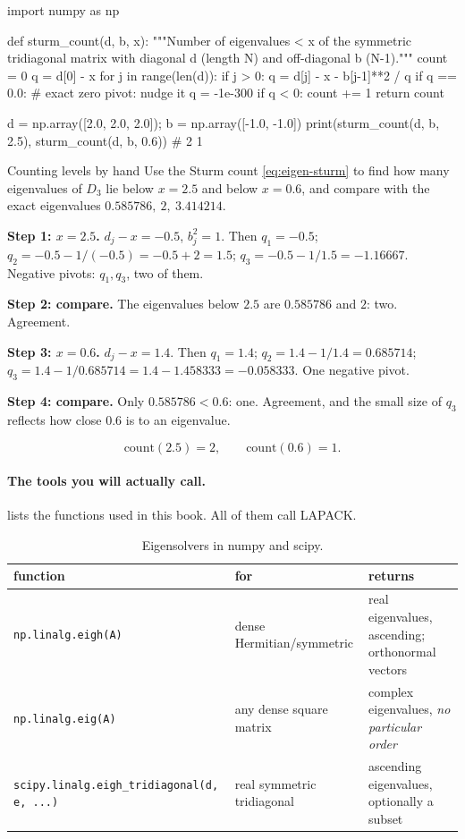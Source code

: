 \begin{pycode}
import numpy as np

def sturm_count(d, b, x):
    """Number of eigenvalues < x of the symmetric tridiagonal
    matrix with diagonal d (length N) and off-diagonal b (N-1)."""
    count = 0
    q = d[0] - x
    for j in range(len(d)):
        if j > 0:
            q = d[j] - x - b[j-1]**2 / q
        if q == 0.0:          # exact zero pivot: nudge it
            q = -1e-300
        if q < 0:
            count += 1
    return count

d = np.array([2.0, 2.0, 2.0]); b = np.array([-1.0, -1.0])
print(sturm_count(d, b, 2.5), sturm_count(d, b, 0.6))   # 2 1
\end{pycode}

\begin{sample}{Counting levels by hand}
Use the Sturm count \eqref{eq:eigen-sturm} to find how many eigenvalues of $D_3$ lie below $x=2.5$ and below $x=0.6$, and compare with the exact eigenvalues $0.585786,\ 2,\ 3.414214$.

\textbf{Step 1: $x=2.5$.} $d_j-x=-0.5$, $b_j^2=1$. Then $q_1=-0.5$; $q_2=-0.5-1/(-0.5)=-0.5+2=1.5$; $q_3=-0.5-1/1.5=-1.16667$. Negative pivots: $q_1,q_3$, two of them.

\textbf{Step 2: compare.} The eigenvalues below $2.5$ are $0.585786$ and $2$: two. Agreement.

\textbf{Step 3: $x=0.6$.} $d_j-x=1.4$. Then $q_1=1.4$; $q_2=1.4-1/1.4=0.685714$; $q_3=1.4-1/0.685714=1.4-1.458333=-0.058333$. One negative pivot.

\textbf{Step 4: compare.} Only $0.585786<0.6$: one. Agreement, and the small size of $q_3$ reflects how close $0.6$ is to an eigenvalue.

\[
\boxed{\text{count}(2.5)=2,\qquad\text{count}(0.6)=1.}
\]
\end{sample}

\paragraph{The tools you will actually call.}  lists the functions used in this book. All of them call LAPACK.

\begin{table}[htbp]\centering
\caption{Eigensolvers in numpy and scipy.}
\label{tab:eigen-solvers}
\begin{tabular}{lll}
\toprule
function & for & returns\\
\midrule
\texttt{np.linalg.eigh(A)} & dense Hermitian/symmetric & real eigenvalues, ascending; orthonormal vectors\\
\texttt{np.linalg.eig(A)} & any dense square matrix & complex eigenvalues, \emph{no particular order}\\
\texttt{scipy.linalg.eigh\_tridiagonal(d, e, ...)} & real symmetric tridiagonal & ascending eigenvalues, optionally a subset\\
\bottomrule
\end{tabular}
\end{table}

